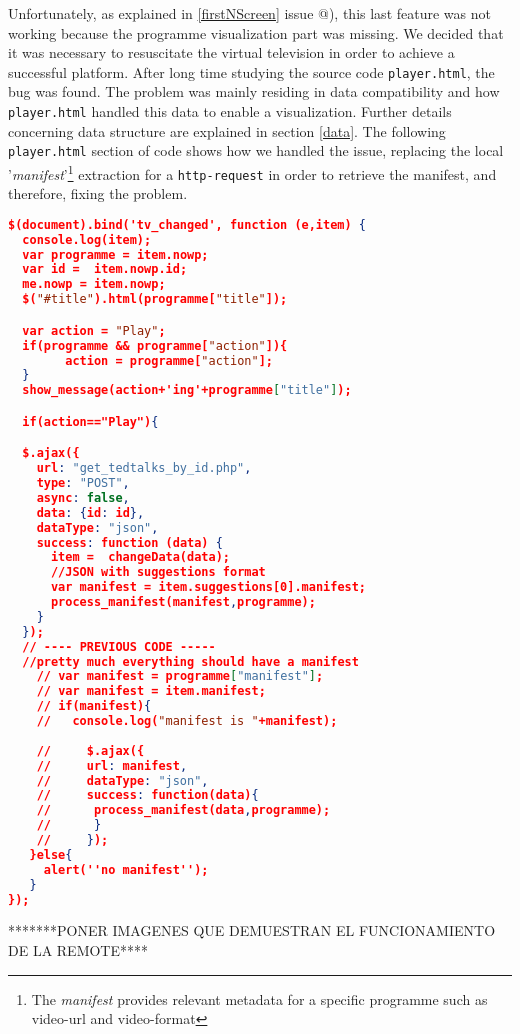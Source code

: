 \documentclass{acm_proc_article-sp}
\makeatletter
\newcommand*{\rom}[1]{\expandafter\@slowromancap\romannumeral #1@}
\makeatother
\begin{document}
Unfortunately, as explained in \ref{firstNScreen} issue \rom{4}), this last feature was not working because the programme visualization part was missing. We decided that it was necessary to resuscitate the virtual television in order to achieve a successful platform. After long time studying the source code \texttt{player.html}, the bug was found. The problem was mainly residing in data compatibility and how \texttt{player.html} handled this data to enable a visualization. Further details concerning data structure are explained in section \ref{data}. The following \texttt{player.html} section of code shows how we handled the issue, replacing the local '\textit{manifest}'\footnote{The \textit{manifest} provides relevant  metadata for a specific programme such as video-url and video-format} extraction for a \texttt{http-request} in order to retrieve the manifest, and therefore, fixing the problem. 
\begin{lstlisting}[language=json,firstnumber=1]
$(document).bind('tv_changed', function (e,item) {
  console.log(item);
  var programme = item.nowp;
  var id =  item.nowp.id;
  me.nowp = item.nowp;
  $("#title").html(programme["title"]);

  var action = "Play";
  if(programme && programme["action"]){
        action = programme["action"];
  }  
  show_message(action+'ing'+programme["title"]);

  if(action=="Play"){

  $.ajax({
    url: "get_tedtalks_by_id.php",
    type: "POST",
    async: false,
    data: {id: id},
    dataType: "json",
    success: function (data) {
      item =  changeData(data); 
      //JSON with suggestions format
      var manifest = item.suggestions[0].manifest;
      process_manifest(manifest,programme);
    }
  });
  // ---- PREVIOUS CODE -----
  //pretty much everything should have a manifest
    // var manifest = programme["manifest"];
    // var manifest = item.manifest;
    // if(manifest){
    //   console.log("manifest is "+manifest);
  
    //     $.ajax({
    //     url: manifest,
    //     dataType: "json",
    //     success: function(data){
    //      process_manifest(data,programme);
    //      }
    //     }); 
   }else{
     alert(''no manifest'');
   }
});
\end{lstlisting}

*******PONER IMAGENES QUE DEMUESTRAN EL FUNCIONAMIENTO DE LA REMOTE****
\end{document}
